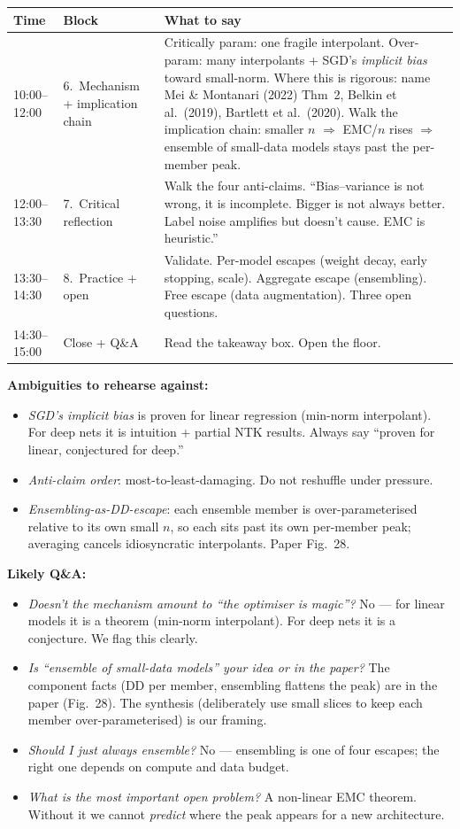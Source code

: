 \documentclass[10pt,a4paper]{article}
\begin{document}
\begin{tabularx}{\linewidth}{@{}p{1.6cm}p{3cm}X@{}}
\toprule
Time & Block & What to say\\
\midrule
10:00--12:00 & 6.~Mechanism + implication chain & Critically param: one fragile interpolant. Over-param: many interpolants + SGD's \emph{implicit bias} toward small-norm. Where this is rigorous: name Mei \& Montanari (2022) Thm~2, Belkin et al.\ (2019), Bartlett et al.\ (2020). Walk the implication chain: smaller \(n\) \(\Rightarrow\) EMC/\(n\) rises \(\Rightarrow\) ensemble of small-data models stays past the per-member peak.\\
12:00--13:30 & 7.~Critical reflection & Walk the four anti-claims. ``Bias--variance is not wrong, it is incomplete. Bigger is not always better. Label noise amplifies but doesn't cause. EMC is heuristic.''\\
13:30--14:30 & 8.~Practice + open & Validate. Per-model escapes (weight decay, early stopping, scale). Aggregate escape (ensembling). Free escape (data augmentation). Three open questions.\\
14:30--15:00 & Close + Q\&A & Read the takeaway box. Open the floor.\\
\bottomrule
\end{tabularx}

\textbf{Ambiguities to rehearse against:}
\begin{itemize}
\item \emph{SGD's implicit bias} is proven for linear regression (min-norm interpolant). For deep nets it is intuition + partial NTK results. Always say ``proven for linear, conjectured for deep.''
\item \emph{Anti-claim order}: most-to-least-damaging. Do not reshuffle under pressure.
\item \emph{Ensembling-as-DD-escape}: each ensemble member is over-parameterised relative to its own small \(n\), so each sits past its own per-member peak; averaging cancels idiosyncratic interpolants. Paper Fig.~28.
\end{itemize}

\textbf{Likely Q\&A:}
\begin{itemize}
\item \emph{Doesn't the mechanism amount to ``the optimiser is magic''?} No --- for linear models it is a theorem (min-norm interpolant). For deep nets it is a conjecture. We flag this clearly.
\item \emph{Is ``ensemble of small-data models'' your idea or in the paper?} The component facts (DD per member, ensembling flattens the peak) are in the paper (Fig.~28). The synthesis (deliberately use small slices to keep each member over-parameterised) is our framing.
\item \emph{Should I just always ensemble?} No --- ensembling is one of four escapes; the right one depends on compute and data budget.
\item \emph{What is the most important open problem?} A non-linear EMC theorem. Without it we cannot \emph{predict} where the peak appears for a new architecture.
\end{itemize}
\end{document}
